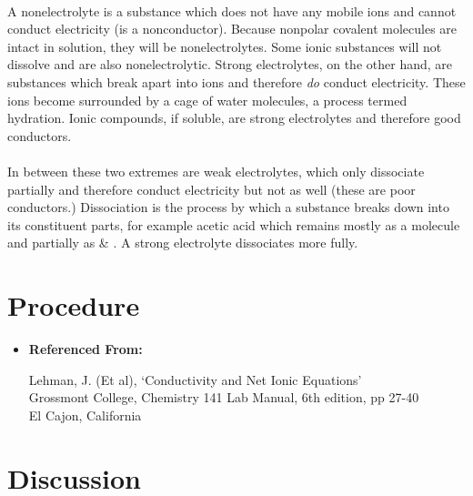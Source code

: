 \documentclass[fleqn,titlepage]{article}
\begin{document}
  \paragraph{} A nonelectrolyte is a substance which does not have any mobile ions and cannot conduct electricity (is a nonconductor). Because nonpolar covalent molecules are intact in solution, they will be nonelectrolytes. Some ionic substances will not dissolve and are also nonelectrolytic.
  Strong electrolytes, on the other hand, are substances which break apart into ions and therefore \emph{do} conduct electricity. These ions become surrounded by a cage of water molecules, a process termed hydration. Ionic compounds, if soluble, are strong electrolytes and therefore good conductors.
  \paragraph{} In between these two extremes are weak electrolytes, which only dissociate partially and therefore conduct electricity but not as well (these are poor conductors.) Dissociation is the process by which a substance breaks down into its constituent parts, for example acetic acid which remains mostly as a molecule and partially as  \& . A strong electrolyte dissociates more fully.

\section*{Procedure}
\begin{itemize}
  \item  \textbf{Referenced From:} \\
    \begin{addmargin}[1em]{1em}
      Lehman, J. (Et al), `Conductivity and Net Ionic Equations' \\
      Grossmont College, Chemistry 141 Lab Manual, 6th edition, pp 27-40 \\
      El Cajon, California
    \end{addmargin}
\end{itemize}

\section*{Discussion}
\end{document}
